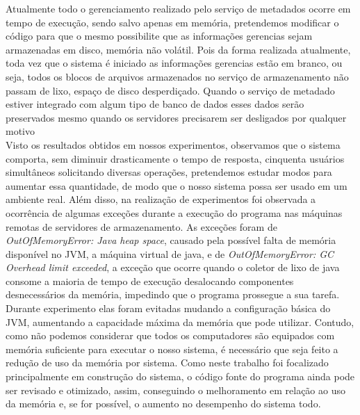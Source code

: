 Atualmente todo o gerenciamento realizado pelo serviço de metadados ocorre em tempo de execução, sendo salvo apenas em memória, pretendemos modificar o código para que o mesmo possibilite que as informações gerencias sejam armazenadas em disco, memória não volátil. Pois da forma realizada atualmente, toda vez que o sistema é iniciado as informações gerencias estão em branco, ou seja, todos os blocos de arquivos armazenados no serviço de armazenamento não passam de lixo, espaço de disco desperdiçado. Quando o serviço de metadado estiver integrado com algum tipo de banco de dados esses dados serão preservados mesmo quando os servidores precisarem ser desligados por qualquer motivo
\\

Visto os resultados obtidos em nossos experimentos, observamos que o sistema comporta, sem diminuir drasticamente o tempo de resposta, cinquenta usuários simultâneos  solicitando diversas operações, pretendemos estudar modos para aumentar essa quantidade, de modo que o nosso sistema possa ser usado em um ambiente real.
Além disso, na realização de experimentos foi observada a ocorrência de algumas exceções durante a execução do programa nas máquinas remotas de servidores de armazenamento. As exceções foram de \textit{OutOfMemoryError: Java heap space}, causado pela possível falta de memória disponível no JVM, a máquina virtual de java, e de \textit{OutOfMemoryError: GC Overhead limit exceeded}, a exceção que ocorre quando o coletor de lixo de java consome a maioria de tempo de execução desalocando componentes desnecessários da memória, impedindo que o programa prossegue a sua tarefa.
Durante experimento elas foram evitadas mudando a configuração básica do JVM, aumentando a capacidade máxima da memória que pode utilizar. Contudo, como não podemos considerar que todos os computadores são equipados com memória suficiente para executar o nosso sistema, é necessário que seja feito a redução de uso da memória por sistema. 
Como neste trabalho foi focalizado principalmente em construção do sistema, o código fonte do programa ainda pode ser revisado e otimizado, assim, conseguindo o melhoramento em relação ao uso da memória e, se for possível, o aumento no desempenho do sistema todo.
\\


